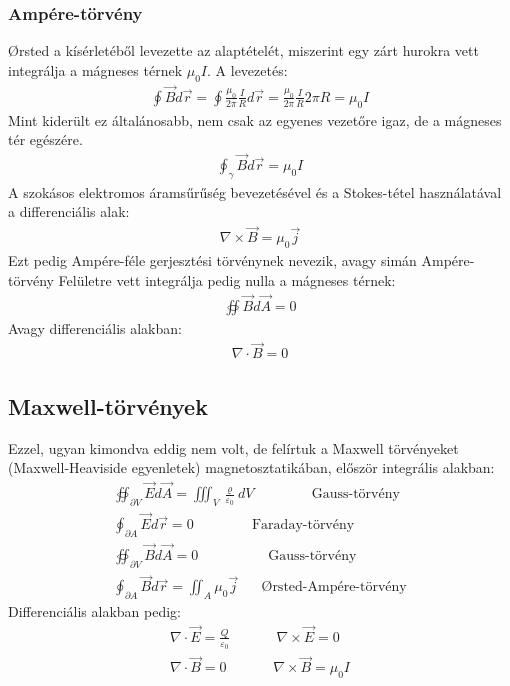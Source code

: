 \documentclass{article}
\begin{document}
\subsubsection{Ampére-törvény}
Ørsted a kísérletéből levezette az alaptételét, miszerint egy zárt hurokra vett integrálja a mágneses térnek $\mu_0 I$. A levezetés:
\begin{gather*}
\oint \vec{B} d\vec{r} = \oint \frac{\mu_0}{2\pi} \frac{I}{R} d\vec{r} = \frac{\mu_0}{2\pi} \frac{I}{R} 2\pi R = \mu_0 I
\end{gather*}
Mint kiderült ez általánosabb, nem csak az egyenes vezetőre igaz, de a mágneses tér egészére.
\begin{gather*}
\boxed{
\oint_\gamma \vec{B} d\vec{r}= \mu_0 I }
\end{gather*}
A szokásos elektromos áramsűrűség bevezetésével és a Stokes-tétel használatával a differenciális alak:
\begin{gather*}
\boxed{
\nabla \times \vec{B} = \mu_0 \vec{j}}
\end{gather*}
Ezt pedig Ampére-féle gerjesztési törvénynek nevezik, avagy simán Ampére-törvény
Felületre vett integrálja pedig nulla a mágneses térnek: 
\begin{gather*}
\boxed{\oiint \vec{B} d\vec{A} = 0} 
\end{gather*}
Avagy differenciális alakban:
\begin{gather*}
\boxed{\nabla \cdot \vec{B} = 0}
\end{gather*}
\subsection{Maxwell-törvények}
Ezzel, ugyan kimondva eddig nem volt, de felírtuk a Maxwell törvényeket (Maxwell-Heaviside egyenletek) magnetosztatikában, először integrális alakban: 
\begin{gather*}
\oiint_{\partial V} \vec{E} d\vec{A}= \iiint_V \frac{\varrho}{\varepsilon_0} dV \hspace{50pt} \text{Gauss-törvény} \\
\oint_{\partial A} \vec{E} d\vec{r} = 0 \hspace{50pt} \text{Faraday-törvény} \\
\oiint_{\partial V} \vec{B} d\vec{A} = 0 \hspace{60pt} \text{Gauss-törvény} \\
\oint_{\partial A} \vec{B} d\vec{r} = \iint_{A} \mu_0 \vec{j} \hspace{20pt} \text{Ørsted-Ampére-törvény} 
\end{gather*}
Differenciális alakban pedig:
\begin{gather*}
\nabla \cdot \vec{E} = \frac{Q}{\varepsilon_0} \hspace{40pt} \nabla \times \vec{E} = 0 \\
\nabla \cdot \vec{B} = 0 \hspace{40pt}
\nabla \times \vec{B} = \mu_0 I
\end{gather*}
\end{document}
